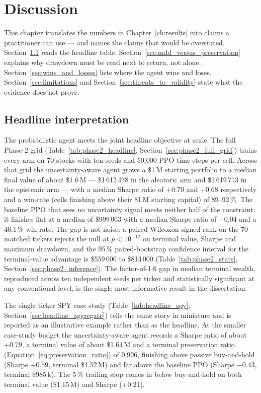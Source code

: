 \chapter{Discussion}
\label{ch:discussion}

This chapter translates the numbers in Chapter~\ref{ch:results} into claims a practitioner can use --- and names the claims that would be overstated. Section~\ref{sec:headline_interpretation} reads the headline table. Section~\ref{sec:mdd_versus_preservation} explains why drawdown must be read next to return, not alone. Section~\ref{sec:wins_and_losses} lists where the agent wins and loses. Section~\ref{sec:limitations} and Section~\ref{sec:threats_to_validity} state what the evidence does not prove.

\section{Headline interpretation}
\label{sec:headline_interpretation}

The probabilistic agent meets the joint headline objective at scale. The full Phase-2 grid (Table~\ref{tab:phase2_headline}, Section~\ref{sec:phase2_full_grid}) trains every arm on 70 stocks with ten seeds and 50,000 PPO time-steps per cell. Across that grid the uncertainty-aware agent grows a \$1\,M starting portfolio to a median final value of about \$1.6\,M --- \$1\,612\,478 in the aleatoric arm and \$1\,619\,713 in the epistemic arm --- with a median Sharpe ratio of $+0.70$ and $+0.68$ respectively and a win-rate (cells finishing above their \$1\,M starting capital) of 89--92\,\%. The baseline PPO that sees no uncertainty signal meets neither half of the constraint: it finishes flat at a median of \$999\,063 with a median Sharpe ratio of $-0.04$ and a 46.1\,\% win-rate. The gap is not noise: a paired Wilcoxon signed-rank on the 70 matched tickers rejects the null at $p < 10^{-12}$ on terminal value, Sharpe and maximum drawdown, and the 95\,\% paired-bootstrap confidence interval for the terminal-value advantage is \$559\,000 to \$814\,000 (Table~\ref{tab:phase2_stats}, Section~\ref{sec:phase2_inference}). The factor-of-1.6 gap in median terminal wealth, reproduced across ten independent seeds per ticker and statistically significant at any conventional level, is the single most informative result in the dissertation.

The single-ticker SPY case study (Table~\ref{tab:headline_spy}, Section~\ref{sec:headline_aggregate}) tells the same story in miniature and is reported as an illustrative example rather than as the headline. At the smaller case-study budget the uncertainty-aware agent records a Sharpe ratio of about $+0.79$, a terminal value of about \$1.64\,M and a terminal preservation ratio (Equation~\ref{eq:preservation_ratio}) of 0.996, finishing above passive buy-and-hold (Sharpe $+0.59$, terminal \$1.52\,M) and far above the baseline PPO (Sharpe $-0.43$, terminal \$985\,k). The 5\,\% trailing stop comes in below buy-and-hold on both terminal value (\$1.15\,M) and Sharpe ($+0.21$).

